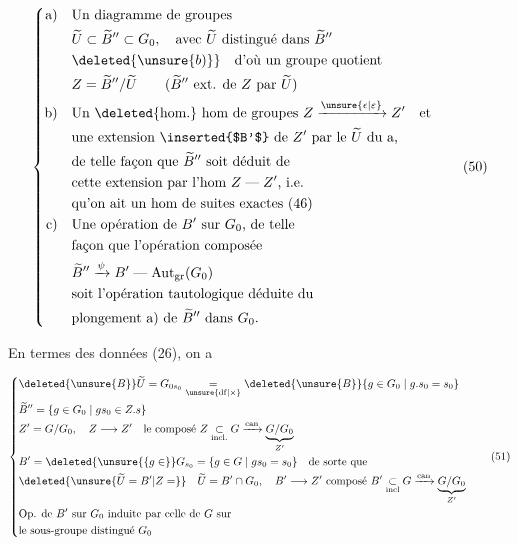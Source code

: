 \[
\left\{\begin{aligned}
\text{a)}\quad&\text{Un diagramme de groupes}\\
 &\widetilde U\subset\widetilde B''\subset G_0,\quad\text{avec $\widetilde U$ distingué dans $\widetilde B''$}\\
 &\deleted{\unsure{b)}}\quad\text{d'où un groupe quotient}\\
 &Z=\widetilde B''/\widetilde U\qquad(\widetilde B''\text{ ext. de $Z$ par $\widetilde U$})\\
\text{b)}\quad&\text{Un \deleted{hom.} hom de groupes }Z\xrightarrow{\unsure{\epsilon|\varepsilon}}Z'\quad\text{et}\\
 &\text{une extension \inserted{$B'$} de $Z'$ par le $\widetilde U$ du a,}\\
 &\text{de telle façon que $\widetilde B''$ soit déduit de}\\
 &\text{cette extension par l'hom $Z\mathrel{\text{---}}Z'$, i.e.}\\
 &\text{qu'on ait un hom de suites exactes (46)}\\
\text{c)}\quad&\text{Une opération de $B'$ sur $G_0$, de telle}\\
 &\text{façon que l'opération composée}\\
 &\widetilde B''\xrightarrow{\psi}B'\mathrel{\text{---}}\operatorname{Aut}_{\rm gr}(G_0)\\
 &\text{soit l'opération tautologique déduite du}\\
 &\text{plongement a) de $\widetilde B''$ dans $G_0$.}
\end{aligned}\right.\tag*{(50)}
\]


En termes des données (26), on a

\[
\left\{\begin{aligned}
 &\deleted{\unsure{B}}\widetilde U=G_{0s_0}\underset{\unsure{\mathrm{df}|\times}}{=}\deleted{\unsure{B}}\{g\in G_0\mid g.s_0=s_0\}\\
 &\widetilde B''=\{g\in G_0\mid gs_0\in Z.s\}\\
 &Z'=G/G_0,\quad Z\longrightarrow Z'\quad\text{le composé }Z\underset{\rm incl.}{\subset}G\xrightarrow{\rm can}\underbrace{G/G_0}_{Z'}\\
 &B'=\deleted{\unsure{\{g\in}}G_{s_0}=\{g\in G\mid gs_0=s_0\}\quad\text{de sorte que}\\
 &\deleted{\unsure{\widetilde U=B'|Z=}}\quad\widetilde U=B'\cap G_0,\quad B'\longrightarrow Z'\ \text{composé }B'\underset{\rm incl}{\subset}G\xrightarrow{\rm can}\underbrace{G/G_0}_{Z'}\\
 &\text{Op. de $B'$ sur $G_0$ induite par celle de $G$ sur}\\
 &\text{le sous-groupe distingué $G_0$}
\end{aligned}\right.\tag*{(51)}
\]

